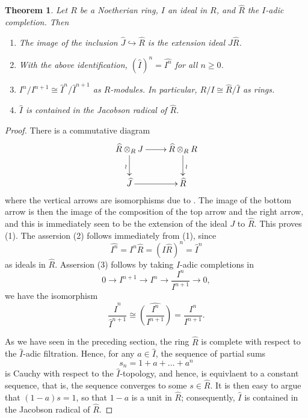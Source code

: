 \documentclass[11pt]{article}
\theoremstyle{thmstyle}
\newtheorem{theorem}{Theorem}[section]
\theoremstyle{defstyle}
\newcommand{\wh}[1]{\widehat{#1}}
\newcommand{\into}{\hookrightarrow}
\renewcommand{\ge}{\geqslant}
\begin{document}
\begin{theorem}
    Let $R$ be a Noetherian ring, $I$ an ideal in $R$, and $\wh R$ the $I$-adic completion. Then 
    \begin{enumerate}[label=(\arabic*)]
        \item The image of the inclusion $\wh J\into \wh R$ is the extension ideal $J\wh R$.
        \item With the above identification, $\left(\wh I\right)^n = \wh{I^n}$ for all $n\ge 0$. 
        \item $I^n/I^{n + 1}\cong \wh I^n/\wh I^{n + 1}$ as $R$-modules. In particular, $R/I\cong\wh R/\wh I$ as rings.
        \item $\wh I$ is contained in the Jacobson radical of $\wh R$.
    \end{enumerate}
\end{theorem}
\begin{proof} %
    There is a commutative diagram 
    \begin{equation*}
        \xymatrix {
            \wh R\otimes_R J\ar[r]\ar[d]_{\wr} & \wh R\otimes_R R\ar[d]^\wr\\
            \wh J\ar[r] & \wh R
        }
    \end{equation*}
    where the vertical arrows are isomorphisms due to . The image of the bottom arrow is then the image of the composition of the top arrow and the right arrow, and this is immediately seen to be the extension of the ideal $J$ to $\wh R$. This proves (1). The assersion (2) follows immediately from (1), since 
    \begin{equation*}
        \wh{I^n} = I^n\wh R = \left(I\wh R\right)^n = \wh I^n
    \end{equation*}
    as ideals in $\wh R$.  Assersion (3) follows by taking $I$-adic completions in 
    \begin{equation*}
        0\to I^{n + 1}\to I^n\to\frac{I^n}{I^{n + 1}}\to 0,
    \end{equation*}
    we have the isomorphism 
    \begin{equation*}
        \frac{\wh I^n}{\wh I^{n + 1}}\cong\wh{\left(\frac{I^n}{I^{n + 1}}\right)} = \frac{I^n}{I^{n + 1}}.
    \end{equation*}

    As we have seen in the preceding section, the ring $\wh R$ is complete with respect to the $\wh I$-adic filtration. Hence, for any $a\in\wh I$, the sequence of partial sums 
    \begin{equation*}
        s_n = 1 + a + \dots + a^n
    \end{equation*}
    is Cauchy with respect to the $\wh I$-topology, and hence, is equivlaent to a constant sequence, that is, the sequence converges to some $s\in\wh R$. It is then easy to argue that $(1 - a)s = 1$, so that $1 - a$ is a unit in $\wh R$; consequently, $\wh I$ is contained in the Jacobson radical of $\wh R$.
\end{proof}
\end{document}
